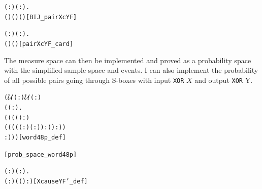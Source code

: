 \documentclass{article}
\begin{document}
\begin{alltt}
\HOLTokenTurnstile{} \HOLSymConst{\HOLTokenForall{}}( :) ( :).
      ( ) (  ) (  )\hfill{[BIJ_pairXcYF]}
\end{alltt}

\begin{alltt}
\HOLTokenTurnstile{} \HOLSymConst{\HOLTokenForall{}}( :) ( :).
      (  ) \HOLSymConst{=}  (  )\hfill{[pairXcYF_card]}
\end{alltt}

The measure space can then be implemented and proved as a probability space with the simplified sample space and events.
I can also implement the probability of all possible pairs going through S-boxes with input \verb|XOR| $X$ and output \verb|XOR| Y.
\begin{alltt}
\HOLTokenTurnstile{}  \HOLSymConst{=}
   (\ensuremath{{\cal{U}}}(:)\HOLSymConst{,} \ensuremath{{\cal{U}}}(:)\HOLSymConst{,}
    (\HOLTokenLambda{}( : \HOLTokenMap{} ).
         ((((\HOLSymConst{\&} ) :) \HOLSymConst{/}
           ((\HOLSymConst{\&}((( :) \HOLSymConst{\HOLTokenExp{}} ( :)) :)) :))
            :)))\hfill{[word48p_def]}
\end{alltt}

\begin{alltt}
\HOLTokenTurnstile{}  \hfill{[prob_space_word48p]}
\end{alltt}

\begin{alltt}
\HOLTokenTurnstile{} \HOLSymConst{\HOLTokenForall{}}( :) ( :).
        \HOLSymConst{=}
      
       \HOLTokenLeftbrace{} \HOLTokenBar{} (  :) \HOLSymConst{\HOLTokenEor{}} ( ( \HOLSymConst{\HOLTokenEor{}}  ) :) \HOLSymConst{=} \HOLTokenRightbrace{}\hfill{[XcauseYF'_def]}
\end{alltt}
\end{document}
